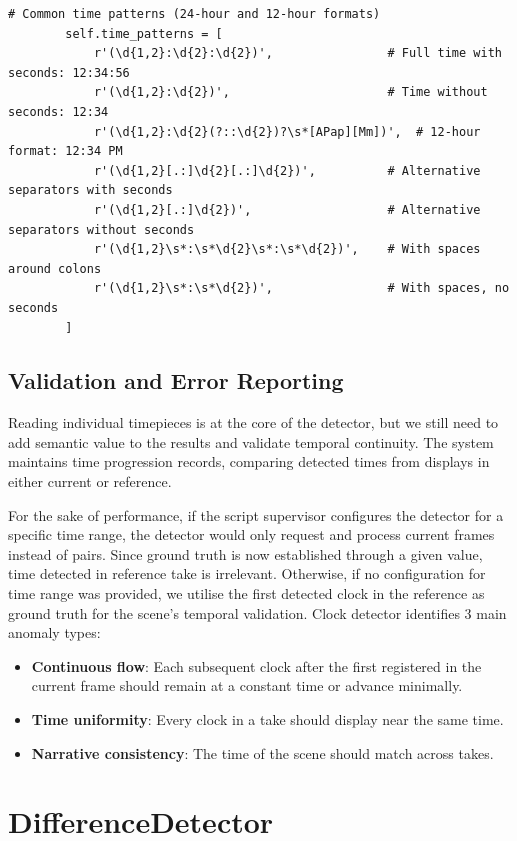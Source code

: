 \begin{verbatim}
# Common time patterns (24-hour and 12-hour formats)
        self.time_patterns = [
            r'(\d{1,2}:\d{2}:\d{2})',                # Full time with seconds: 12:34:56
            r'(\d{1,2}:\d{2})',                      # Time without seconds: 12:34
            r'(\d{1,2}:\d{2}(?::\d{2})?\s*[APap][Mm])',  # 12-hour format: 12:34 PM
            r'(\d{1,2}[.:]\d{2}[.:]\d{2})',          # Alternative separators with seconds
            r'(\d{1,2}[.:]\d{2})',                   # Alternative separators without seconds
            r'(\d{1,2}\s*:\s*\d{2}\s*:\s*\d{2})',    # With spaces around colons
            r'(\d{1,2}\s*:\s*\d{2})',                # With spaces, no seconds
        ]
\end{verbatim}

\subsection{Validation and Error Reporting}
Reading individual timepieces is at the core of the detector, but we still need to add semantic value to the results and validate temporal continuity. The system maintains time progression records, comparing detected times from displays in either current or reference. 

For the sake of performance, if the script supervisor configures the detector for a specific time range, the detector would only request and process current frames instead of pairs. Since ground truth is now established through a given value, time detected in reference take is irrelevant. Otherwise, if no configuration for time range was provided, we utilise the first detected clock in the reference as ground truth for the scene's temporal validation. Clock detector identifies 3 main anomaly types:
\begin{itemize}
\item \textbf{Continuous flow}: Each subsequent clock after the first registered in the current frame should remain at a constant time or advance minimally.
\item \textbf{Time uniformity}: Every clock in a take should display near the same time.
\item \textbf{Narrative consistency}: The time of the scene should match across takes.
\end{itemize}

\section{DifferenceDetector}

